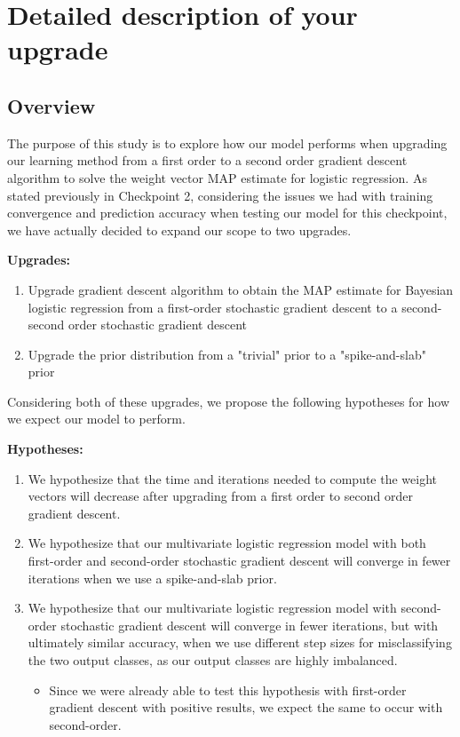 \documentclass[12pt]{extarticle}
\begin{document}
\newpage

\section{Detailed description of your upgrade}

\subsection{Overview}

The purpose of this study is to explore how our model performs when upgrading our
learning method from a first order to a second order gradient descent algorithm to solve the
weight vector MAP estimate for logistic regression. As stated previously in Checkpoint 2, considering the issues we had with training convergence and prediction accuracy when testing our model for this checkpoint, we have actually decided to expand our scope to two upgrades.

\textbf{Upgrades:}

\begin{enumerate}
\item Upgrade gradient descent algorithm to obtain the MAP estimate for Bayesian logistic regression from a first-order stochastic gradient descent to a second-second order stochastic gradient descent
\item Upgrade the prior distribution from a "trivial" prior to a "spike-and-slab" prior
\end{enumerate}


Considering both of these upgrades, we propose the following hypotheses
for how we expect our model to perform.

\textbf{Hypotheses:}

\begin{enumerate}
\item We hypothesize that the time and iterations needed to compute the weight vectors will decrease
after upgrading from a first order to second order gradient descent.

\item We hypothesize that our multivariate logistic regression model with both first-order and second-order stochastic gradient descent will converge in fewer iterations when we use a spike-and-slab prior.

\item We hypothesize that our multivariate logistic regression model with second-order stochastic gradient descent will converge in fewer iterations, but with ultimately similar accuracy, when we use different step sizes for misclassifying the two output classes, as our output classes are highly imbalanced.

	\begin{itemize}
	\item Since we were already able to test this hypothesis with first-order gradient descent with positive results, we expect the same to occur with second-order.
	\end{itemize}

\end{enumerate}
\end{document}

